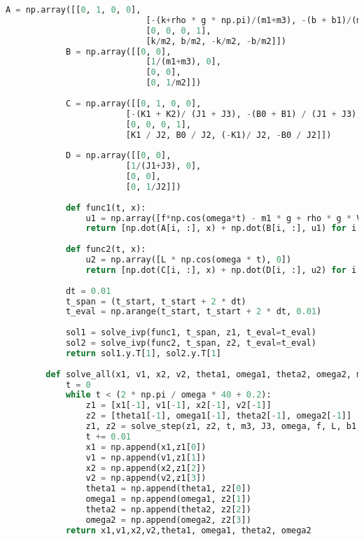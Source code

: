 \documentclass[withoutpreface,bwprint]{cumcmthesis} %
\begin{document}
\begin{appendices}
\begin{lstlisting}[language=python]
            A = np.array([[0, 1, 0, 0], 
                            [-(k+rho * g * np.pi)/(m1+m3), -(b + b1)/(m1+m3), k/(m1+m3), b/(m1+m3)], 
                            [0, 0, 0, 1], 
                            [k/m2, b/m2, -k/m2, -b/m2]])
            B = np.array([[0, 0], 
                            [1/(m1+m3), 0], 
                            [0, 0], 
                            [0, 1/m2]])
            
            C = np.array([[0, 1, 0, 0],
                        [-(K1 + K2)/ (J1 + J3), -(B0 + B1) / (J1 + J3), K1 / (J1 + J3), B0 /(J1 + J3)],
                        [0, 0, 0, 1],
                        [K1 / J2, B0 / J2, (-K1)/ J2, -B0 / J2]])
            
            D = np.array([[0, 0], 
                        [1/(J1+J3), 0], 
                        [0, 0], 
                        [0, 1/J2]])
        
            def func1(t, x):
                u1 = np.array([f*np.cos(omega*t) - m1 * g + rho * g * V0 - k * x0, - m2 * g + k * x0])
                return [np.dot(A[i, :], x) + np.dot(B[i, :], u1) for i in range(4)]
            
            def func2(t, x):
                u2 = np.array([L * np.cos(omega * t), 0])
                return [np.dot(C[i, :], x) + np.dot(D[i, :], u2) for i in range(4)]
        
            dt = 0.01
            t_span = (t_start, t_start + 2 * dt)
            t_eval = np.arange(t_start, t_start + 2 * dt, 0.01)
        
            sol1 = solve_ivp(func1, t_span, z1, t_eval=t_eval)
            sol2 = solve_ivp(func2, t_span, z2, t_eval=t_eval)
            return sol1.y.T[1], sol2.y.T[1]
        
        def solve_all(x1, v1, x2, v2, theta1, omega1, theta2, omega2, m3, J3, omega, f, L, b1:float, B1:float, b0:float, B0:float):
            t = 0
            while t < (2 * np.pi / omega * 40 + 0.2):
                z1 = [x1[-1], v1[-1], x2[-1], v2[-1]]
                z2 = [theta1[-1], omega1[-1], theta2[-1], omega2[-1]]
                z1, z2 = solve_step(z1, z2, t, m3, J3, omega, f, L, b1, B1, b0, B0)
                t += 0.01
                x1 = np.append(x1,z1[0])
                v1 = np.append(v1,z1[1])
                x2 = np.append(x2,z1[2])
                v2 = np.append(v2,z1[3])
                theta1 = np.append(theta1, z2[0])
                omega1 = np.append(omega1, z2[1])
                theta2 = np.append(theta2, z2[2])
                omega2 = np.append(omega2, z2[3])
            return x1,v1,x2,v2,theta1, omega1, theta2, omega2
        

\end{lstlisting}
\end{appendices}
\end{document}
